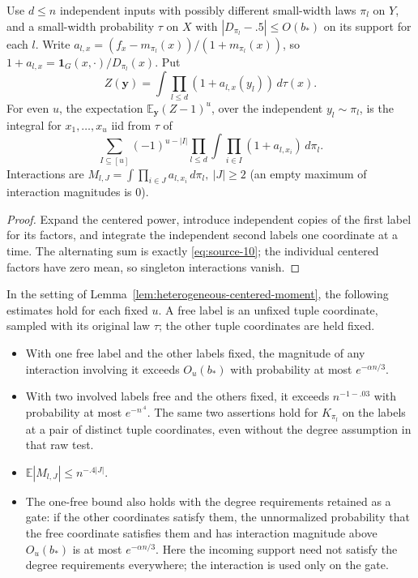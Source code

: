 \begin{lemma}\label{lem:heterogeneous-centered-moment}
Use \(d\le n\) independent inputs with possibly different small-width laws \(\pi_l\) on \(Y\), and a small-width probability \(\tau\) on \(X\) with \(|D_{\pi_l}-.5|\le O(b_*)\) on its support for each \(l\). Write \(a_{l,x}= (f_x-m_{\pi_l}(x))/(1+m_{\pi_l}(x))\), so \(1+a_{l,x}=\mathbf1_G(x,\cdot)/D_{\pi_l}(x)\). Put
\[
 Z(\boldsymbol y)=\int\prod_{l\le d}(1+a_{l,x}(y_l))\,d\tau(x).
\]
For even \(u\), the expectation \(\mathbb E_{\boldsymbol y}(Z-1)^u\), over the independent \(y_l\sim\pi_l\), is the integral for \(x_1,\ldots,x_u\) iid from \(\tau\) of
\begin{equation}
 \sum_{I\subseteq[u]}(-1)^{u-|I|}
       \prod_{l\le d}\int \prod_{i\in I}(1+a_{l,x_i})\,d\pi_l .
 \label{eq:source-10}
\end{equation}
Interactions are \(M_{l,J}=\int\prod_{i\in J}a_{l,x_i}\,d\pi_l,\ |J|\ge2\) (an empty maximum of interaction magnitudes is 0).
\end{lemma}

\begin{proof}
Expand the centered power, introduce independent copies of the first label for its factors, and integrate the independent second labels one coordinate at a time. The alternating sum is exactly \eqref{eq:source-10}; the individual centered factors have zero mean, so singleton interactions vanish.
\end{proof}

\begin{lemma}\label{lem:deep-interaction-tails}
In the setting of Lemma~\ref{lem:heterogeneous-centered-moment}, the following estimates hold for each fixed \(u\). A free label is an unfixed tuple coordinate, sampled with its original law \(\tau\); the other tuple coordinates are held fixed.
\begin{itemize}
\item With one free label and the other labels fixed, the magnitude of any interaction involving it exceeds \(O_u(b_*)\) with probability at most \(e^{-\alpha n/3}\).
\item With two involved labels free and the others fixed, it exceeds \(n^{-1-.03}\) with probability at most \(e^{-n^{.4}}\). The same two assertions hold for \(K_{\pi_l}\) on the labels at a pair of distinct tuple coordinates, even without the degree assumption in that raw test.
\item \(\mathbb E |M_{l,J}|\le n^{-.4|J|}\).
\item The one-free bound also holds with the degree requirements retained as a gate: if the other coordinates satisfy them, the unnormalized probability that the free coordinate satisfies them and has interaction magnitude above \(O_u(b_*)\) is at most \(e^{-\alpha n/3}\). Here the incoming support need not satisfy the degree requirements everywhere; the interaction is used only on the gate.
\end{itemize}
\end{lemma}

